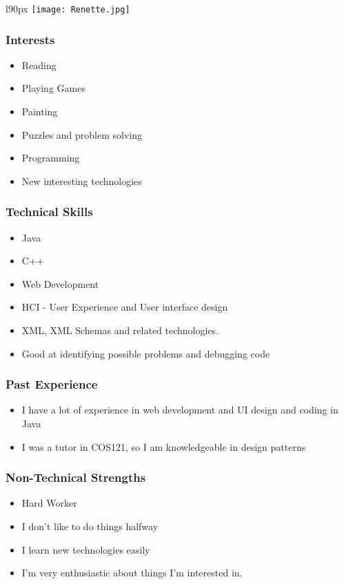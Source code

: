 \begin{wrapfigure}[8]{l}{90px}
\texttt{[image: Renette.jpg]}
\end{wrapfigure}
\textcolor{white}{}
\subsubsection{Interests}
\begin{itemize}
	\item Reading
	\item Playing Games
	\item Painting
	\item Puzzles and problem solving
	\item Programming
	\item New interesting technologies
\end{itemize}
\subsubsection{Technical Skills}
\begin{itemize}
	\item Java
	\item C++
	\item Web Development
	\item HCI - User Experience and User interface design
	\item XML, XML Schemas and related technologies.
	\item Good at identifying possible problems and debugging code
\end{itemize}
\subsubsection{Past Experience}
\begin{itemize}
	\item I have a lot of experience in web development and UI design and coding in Java
	\item I was a tutor in COS121, so I am knowledgeable in design patterns
\end{itemize}
\subsubsection{Non-Technical Strengths}
\begin{itemize}
	\item Hard Worker
	\item I don't like to do things halfway
	\item I learn new technologies easily
	\item I'm very enthusiastic about things I'm interested in.
\end{itemize}